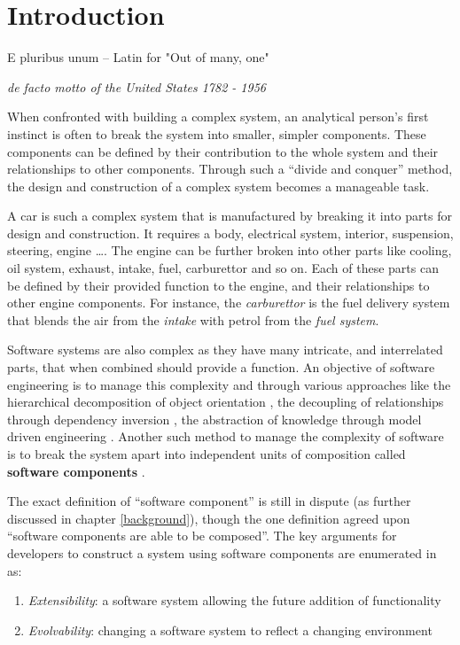 \chapter{Introduction}
\label{introduction}
\epigraph{E pluribus unum -- Latin for "Out of many, one"}
{\textit{de facto motto of the United States 1782 - 1956}}

When confronted with building a complex system, an analytical person's first instinct is often to break the system into smaller, simpler components. 
These components can be defined by their contribution to the whole system and their relationships to other components.
Through such a ``divide and conquer'' method, the design and construction of a complex system becomes a manageable task.

A car is such a complex system that is manufactured by breaking it into parts for design and construction.
It requires a body, electrical system, interior, suspension, steering, engine \ldots. 
The engine can be further broken into other parts like cooling, oil system, exhaust, intake, fuel, carburettor and so on.
Each of these parts can be defined by their provided function to the engine, and their relationships to other engine components.
For instance, the \textit{carburettor} is the fuel delivery system that blends the air from the \textit{intake} with petrol from the \textit{fuel system}.

Software systems are also complex as they have many intricate, and interrelated parts, that when combined should provide a function.
An objective of software engineering is to manage this complexity and through various approaches like the hierarchical decomposition of object orientation \citep{cox1986}, 
the decoupling of relationships through dependency inversion \citep{martin1996dependency}, the abstraction of knowledge through model driven engineering \citep{schmidt2006}. 
Another such method to manage the complexity of software is to break the system apart into independent units of composition called \textbf{software components} \citep{Szyperski2002}. 

The exact definition of ``software component'' is still in dispute (as further discussed in chapter \ref{background}),
though the one definition agreed upon ``software components are able to be composed''.
The key arguments for developers to construct a system using software components are enumerated in \cite{Szyperski2000} as:
\begin{enumerate}
	\item \textit{Extensibility}: a software system allowing the future addition of functionality
	\item \textit{Evolvability}: changing a software system to reflect a changing environment
\end{enumerate}


